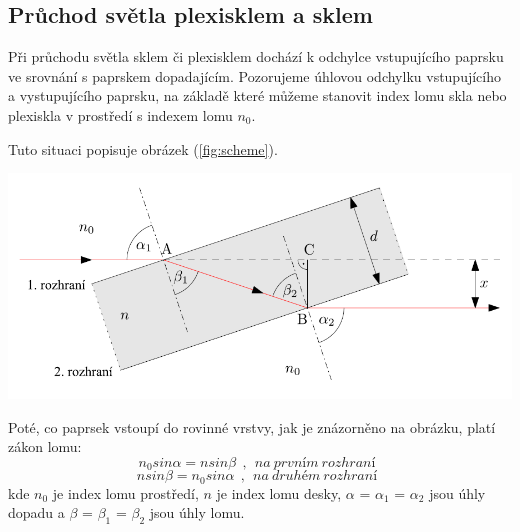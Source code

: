 \documentclass[a4paper,11pt]{article}
\begin{document}
\begin{minipage}[t]{0.5\textwidth}
        \subsection{Průchod světla plexisklem a sklem}
            Při průchodu světla sklem či plexisklem dochází k odchylce vstupujícího paprsku ve srovnání s paprskem dopadajícím. Pozorujeme úhlovou odchylku vstupujícího a vystupujícího paprsku, na základě které můžeme stanovit index lomu skla nebo plexiskla v prostředí s indexem lomu $n_0$.
            \par Tuto situaci popisuje obrázek (\ref{fig:scheme}).
            \vspace{10pt}
            \par \centering
            \includegraphics[scale=0.33]{scheme}
            \captionsetup{justification=centering, font=footnotesize}
            \label{fig:scheme}
            \vspace{10pt}
            \raggedright
            \vspace{10pt}
            \par Poté, co paprsek vstoupí do rovinné vrstvy, jak je znázorněno na obrázku, platí zákon lomu:
            \begin{equation}
                n_0 sin \alpha = n sin \beta ~~,~~ na~prvním~rozhraní~~
            \end{equation}
            \begin{equation}
                n sin \beta = n_0 sin \alpha ~~,~~ na~druhém~rozhraní~~
            \end{equation}
            kde $n_0$ je index lomu prostředí, $n$ je index lomu desky, $\alpha$ = $\alpha_1$ = $\alpha_2$ jsou úhly dopadu a $\beta$ = $\beta_1$ = $\beta_2$ jsou úhly lomu.
    \end{minipage}
    \hspace{10pt}
\end{document}
